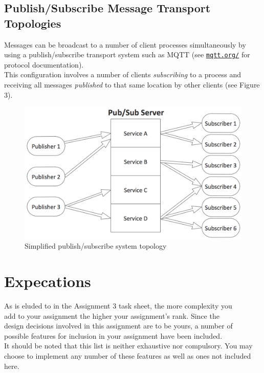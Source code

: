 \documentclass[a4paper, 12pt]{article}
\begin{document}
\subsection{Publish/Subscribe Message Transport Topologies}
Messages can be broadcast to a number of client processes simultaneously
by using a publish/subscribe transport system such as MQTT (see 
\href{http://mqtt.org/}{\texttt{mqtt.org/}} for protocol documentation).\\
This configuration involves a number of clients \emph{subscribing} to a process
and receiving all messages \emph{published} to that same location by other
clients (see Figure 3).
\begin{figure}[h]
\centering
\includegraphics[scale=0.75]{ps_topology}
\caption{Simplified publish/subscribe system topology}
\end{figure}

\pagebreak


\section{Expecations}
As is eluded to in the Assignment 3 task sheet, the more complexity you\\
add to your assignment the higher your assignment's rank. Since the\\design
decisions involved in this assignment are to be yours, a number of\\possible 
features for inclusion in your assignment have been included. 
\\[0.5\baselineskip]
It should be noted that this list is neither exhaustive nor compulsory.
You may choose to implement any number of these features as well as ones not 
included here.
\end{document}
